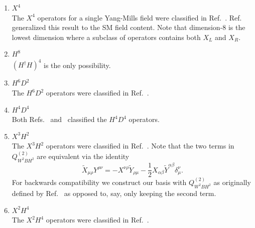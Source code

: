 \begin{enumerate}
\item $X^4$ \\
The $X^4$ operators for a single Yang-Mills field were classified in Ref.~\cite{Morozov:1985ef}.
Ref.~\cite{Remmen:2019cyz} generalized this result to the SM field content.
Note that dimension-8 is the lowest dimension where a subclass of operators contains both $X_L$ and $X_R$.

\item $H^8$ \\
$(H^\dag H)^4$ is the only possibility.

\item $H^6D^2$ \\
The $H^6D^2$ operators were classified in Ref.~\cite{Hays:2018zze}.

\item $H^4D^4$ \\
Both Refs.~\cite{Hays:2018zze} and~\cite{Remmen:2019cyz} classified the $H^4D^4$ operators.

\item $X^3H^2$ \\
The $X^3H^2$ operators were classified in Ref.~\cite{Hays:2018zze}.
Note that the two terms in $Q_{W^2BH^2}^{(2)}$ are equivalent via the identity
\begin{equation}
\widetilde X_{\mu\rho} Y^{\rho\nu} = - X^{\nu\rho} \widetilde Y_{\rho\mu} - \frac{1}{2} X_{\alpha\beta} \widetilde Y^{\alpha\beta} \delta_\mu^\nu .
\end{equation}
For backwards compatibility we construct our basis with $Q_{W^2BH^2}^{(2)}$ as originally defined by Ref.~\cite{Hays:2018zze} as opposed to, say, only keeping the second term.

\item $X^2H^4$ \\
The $X^2H^4$ operators were classified in Ref.~\cite{Hays:2018zze}.


\end{enumerate}
